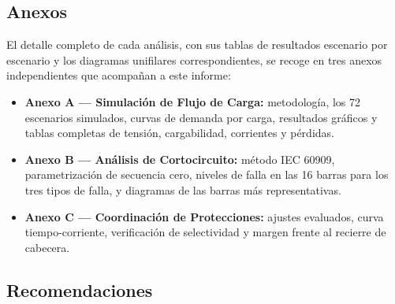 \documentclass[11pt,a4paper]{article}
\begin{document}
\subsection*{Anexos}

El detalle completo de cada an\'alisis, con sus tablas de resultados escenario
por escenario y los diagramas unifilares correspondientes, se recoge en tres
anexos independientes que acompa\~nan a este informe:

\begin{itemize}
\item \textbf{Anexo A --- Simulaci\'on de Flujo de Carga:} metodolog\'ia, los 72
escenarios simulados, curvas de demanda por carga, resultados gr\'aficos y
tablas completas de tensi\'on, cargabilidad, corrientes y p\'erdidas.
\item \textbf{Anexo B --- An\'alisis de Cortocircuito:} m\'etodo IEC 60909,
parametrizaci\'on de secuencia cero, niveles de falla en las 16 barras para los
tres tipos de falla, y diagramas de las barras m\'as representativas.
\item \textbf{Anexo C --- Coordinaci\'on de Protecciones:} ajustes evaluados,
curva tiempo-corriente, verificaci\'on de selectividad y margen frente al
recierre de cabecera.
\end{itemize}

\subsection*{Recomendaciones}
\end{document}

